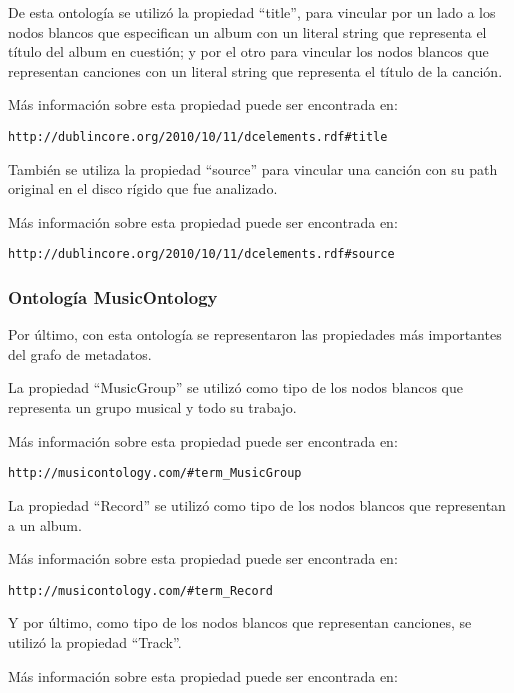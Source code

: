 \documentclass[a4paper,oneside]{report}
\begin{document}
De esta ontología se utilizó la propiedad ``title'', para vincular por un lado a los nodos blancos que especifican un album con un literal string que representa el título del album en cuestión; y por el otro para vincular los nodos blancos que representan canciones con un literal string que representa el título de la canción.

Más información sobre esta propiedad puede ser encontrada en:

\begin{lstlisting}
http://dublincore.org/2010/10/11/dcelements.rdf#title
\end{lstlisting}

También se utiliza la propiedad ``source'' para vincular una canción con su path original en el disco rígido que fue analizado.

Más información sobre esta propiedad puede ser encontrada en:

\begin{lstlisting}
http://dublincore.org/2010/10/11/dcelements.rdf#source
\end{lstlisting}

\subsubsection{Ontología MusicOntology}

Por último, con esta ontología se representaron las propiedades más importantes del grafo de metadatos.

La propiedad ``MusicGroup'' se utilizó como tipo de los nodos blancos que representa un grupo musical y todo su trabajo.

Más información sobre esta propiedad puede ser encontrada en:

\begin{lstlisting}
http://musicontology.com/#term_MusicGroup
\end{lstlisting}

La propiedad ``Record'' se utilizó como tipo de los nodos blancos que representan a un album.

Más información sobre esta propiedad puede ser encontrada en:

\begin{lstlisting}
http://musicontology.com/#term_Record
\end{lstlisting}

Y por último, como tipo de los nodos blancos que representan canciones, se utilizó la propiedad ``Track''.

Más información sobre esta propiedad puede ser encontrada en:
\end{document}
